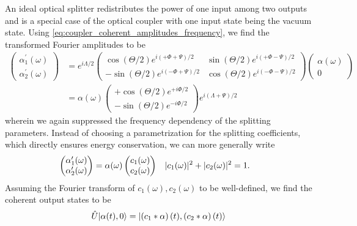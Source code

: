 An ideal optical splitter redistributes the power of one input among two outputs and is a special case of the optical coupler with one input state being the vacuum state.
Using \cref{eq:coupler_coherent_amplitudes_frequency}, we find the transformed Fourier amplitudes to be
\begin{equation}
	\begin{split}
		\begin{pmatrix}
			\alpha_1^\prime(\omega) \\
			\alpha_2^\prime(\omega)
		\end{pmatrix}
		&=
		e^{i\Lambda/2}
		\begin{pmatrix}
			\cos(\Theta/2)
			e^{i\left(+\Phi+\Psi\right)/2}
			&
			\sin(\Theta/2)
			e^{i\left(+\Phi-\Psi\right)/2}
			\\
			-
			\sin(\Theta/2)
			e^{i\left(-\Phi+\Psi\right)/2}
			&
			\cos(\Theta/2)
			e^{i\left(-\Phi-\Psi\right)/2}
		\end{pmatrix}
		\begin{pmatrix}
			\alpha(\omega) \\
			0
		\end{pmatrix}
		\\
		&=
		\alpha(\omega)
		\begin{pmatrix}
			+
			\cos(\Theta/2)
			e^{+i\Phi/2}
			\\
			-
			\sin(\Theta/2)
			e^{-i\Phi/2}
		\end{pmatrix}
		e^{i(\Lambda+\Psi)/2}
	\end{split}
\end{equation}
wherein we again suppressed the frequency dependency of the splitting parameters.
Instead of choosing a parametrization for the splitting coefficients, which directly ensures energy conservation, we can more generally write
\begin{align}
	\begin{pmatrix}
		\alpha_1^\prime(\omega) \\
		\alpha_2^\prime(\omega)
	\end{pmatrix}
	&=
	\alpha(\omega)
	\begin{pmatrix}
		c_1(\omega) \\
		c_2(\omega)
	\end{pmatrix}
	&
	\lvert c_1(\omega)\rvert^2
	+
	\lvert c_2(\omega)\rvert^2
	&=
	1
	.
\end{align}
Assuming the Fourier transform of $c_1(\omega),c_2(\omega)$ to be well-defined, we find the coherent output states to be
\begin{equation}
	\hat{U}
	\ket*{\alpha(t),0}
	=
	\ket*{\left(c_1\conv\alpha\right)(t),\left(c_2\conv\alpha\right)(t)}
	\label{eq:splitter_state_convolution}
\end{equation}
